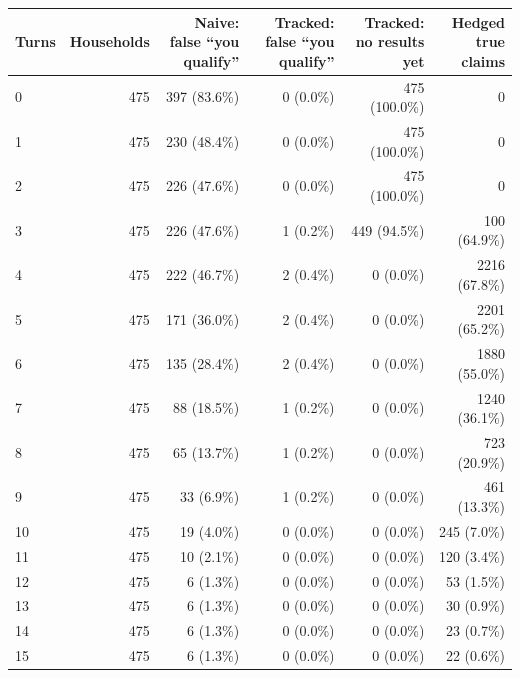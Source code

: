 \begin{tabular}{lrrrrr}
\toprule
Turns & Households & Naive: false ``you qualify'' & Tracked: false ``you qualify'' & Tracked: no results yet & Hedged true claims \\
\midrule
0 & 475 & 397 (83.6\%) & 0 (0.0\%) & 475 (100.0\%) & 0 \\
1 & 475 & 230 (48.4\%) & 0 (0.0\%) & 475 (100.0\%) & 0 \\
2 & 475 & 226 (47.6\%) & 0 (0.0\%) & 475 (100.0\%) & 0 \\
3 & 475 & 226 (47.6\%) & 1 (0.2\%) & 449 (94.5\%) & 100 (64.9\%) \\
4 & 475 & 222 (46.7\%) & 2 (0.4\%) & 0 (0.0\%) & 2216 (67.8\%) \\
5 & 475 & 171 (36.0\%) & 2 (0.4\%) & 0 (0.0\%) & 2201 (65.2\%) \\
6 & 475 & 135 (28.4\%) & 2 (0.4\%) & 0 (0.0\%) & 1880 (55.0\%) \\
7 & 475 & 88 (18.5\%) & 1 (0.2\%) & 0 (0.0\%) & 1240 (36.1\%) \\
8 & 475 & 65 (13.7\%) & 1 (0.2\%) & 0 (0.0\%) & 723 (20.9\%) \\
9 & 475 & 33 (6.9\%) & 1 (0.2\%) & 0 (0.0\%) & 461 (13.3\%) \\
10 & 475 & 19 (4.0\%) & 0 (0.0\%) & 0 (0.0\%) & 245 (7.0\%) \\
11 & 475 & 10 (2.1\%) & 0 (0.0\%) & 0 (0.0\%) & 120 (3.4\%) \\
12 & 475 & 6 (1.3\%) & 0 (0.0\%) & 0 (0.0\%) & 53 (1.5\%) \\
13 & 475 & 6 (1.3\%) & 0 (0.0\%) & 0 (0.0\%) & 30 (0.9\%) \\
14 & 475 & 6 (1.3\%) & 0 (0.0\%) & 0 (0.0\%) & 23 (0.7\%) \\
15 & 475 & 6 (1.3\%) & 0 (0.0\%) & 0 (0.0\%) & 22 (0.6\%) \\
\bottomrule
\end{tabular}
